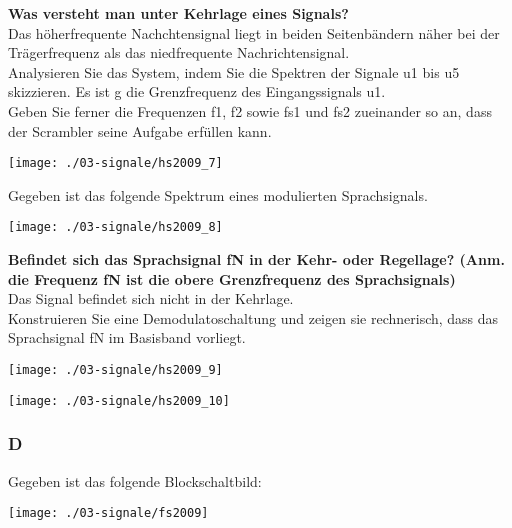 \textbf{Was versteht man unter Kehrlage eines Signals?}\\
Das höherfrequente Nachchtensignal liegt in beiden Seitenbändern näher bei der Trägerfrequenz als das niedfrequente Nachrichtensignal.\\

Analysieren Sie das System, indem Sie die Spektren der Signale u1 bis u5 skizzieren. Es ist g die Grenzfrequenz des Eingangssignals u1.\\
Geben Sie ferner die Frequenzen f1, f2 sowie fs1 und fs2 zueinander so an, dass der Scrambler seine Aufgabe erfüllen kann.
\begin{center}
    \vspace{-8pt}
    \texttt{[image: ./03-signale/hs2009\_7]}
    \vspace{-8pt}
\end{center}

Gegeben ist das folgende Spektrum eines modulierten Sprachsignals.
\begin{center}
    \vspace{-8pt}
    \texttt{[image: ./03-signale/hs2009\_8]}
    \vspace{-8pt}
\end{center}

\textbf{Befindet sich das Sprachsignal fN in der Kehr- oder Regellage? (Anm. die Frequenz fN ist die obere Grenzfrequenz des Sprachsignals)}\\
Das Signal befindet sich nicht in der Kehrlage.\\

Konstruieren Sie eine Demodulatoschaltung und zeigen sie rechnerisch, dass das Sprachsignal fN im Basisband vorliegt.\\
\begin{center}
    \vspace{-8pt}
    \texttt{[image: ./03-signale/hs2009\_9]}
    \vspace{-8pt}
\end{center}

\begin{center}
    \vspace{-8pt}
    \texttt{[image: ./03-signale/hs2009\_10]}
    \vspace{-8pt}
\end{center}

\columnbreak

\subsubsection{D}
Gegeben ist das folgende Blockschaltbild:
\begin{center}
    \vspace{-8pt}
    \texttt{[image: ./03-signale/fs2009]}
    \vspace{-8pt}
\end{center}

